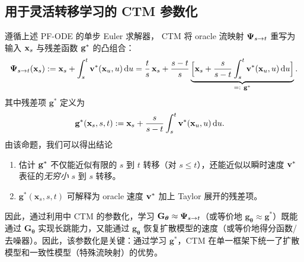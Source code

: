 \subsection{用于灵活转移学习的 CTM 参数化}
遵循上述 PF-ODE 的单步 Euler 求解器，
CTM 将 oracle 流映射 ${\bm{\Psi}}_{s\to t}$
重写为输入 ${\mathbf{x}}_s$ 与残差函数 ${\mathbf{g}}^*$ 的凸组合：
\begin{align*}
{\bm{\Psi}}_{s\to t}({\mathbf{x}}_s)
:= {\mathbf{x}}_s + \int_s^t {\mathbf{v}}^*({\mathbf{x}}_u,u) \mathop{}\!\mathrm{d} u 
= \frac{t}{s}\,{\mathbf{x}}_s
+ \frac{s-t}{s}
\underbrace{\Big[{\mathbf{x}}_s + \frac{s}{s-t} \int_s^t {\mathbf{v}}^*({\mathbf{x}}_u,u) \mathop{}\!\mathrm{d} u\Big]}_{=:~{\mathbf{g}}^*}.
\end{align*}
其中残差项 $\mathbf{g}^*$ 定义为
\begin{align}\label{eq:ctm-g-oracle}
\mathbf{g}^*(\mathbf{x}_{s}, s, t) &:= {\mathbf{x}}_s + \frac{s}{s-t} \int_s^t {\mathbf{v}}^*({\mathbf{x}}_u,u)\mathop{}\!\mathrm{d} u.
\end{align}
由该命题，我们可以得出结论
\begin{enumerate}
    \item 估计 ${\mathbf{g}}^*$ 不仅能近似有限的 $s$ 到 $t$ 转移（对 $s \le t$），还能近似以瞬时速度 ${\mathbf{v}}^*$ 表征的\emph{无穷小} $s$ 到 $s$ 转移。
    \item $\mathbf{g}^*(\mathbf{x}_{s},s,t)$ 可解释为 oracle 速度 ${\mathbf{v}}^*$ 加上 Taylor 展开的残差项。
\end{enumerate}
因此，通过利用中 CTM 的参数化，学习 $\mathbf{G}_{\bm{\theta}} \approx {\bm{\Psi}}_{s\to t}$（或等价地 $\mathbf{g}_{\bm{\theta}} \approx \mathbf{g}^*$）既能通过 $\mathbf{G}_{\bm{\theta}}$ 实现长跳能力，又能通过 $\mathbf{g}_{\bm{\theta}}$ 恢复扩散模型的速度（或等价地得分函数/去噪器）。因此，该参数化是关键：通过学习 $\mathbf{g}^*$，CTM 在单一框架下统一了扩散模型和一致性模型（特殊流映射）的优势。



